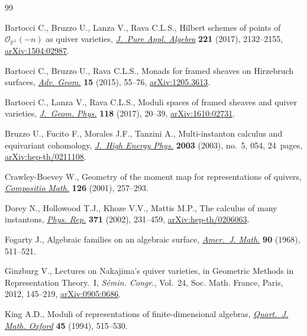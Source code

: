 \documentclass[pdftex]{sigma}
\numberwithin{equation}{section}
\begin{document}
\begin{thebibliography}{99}
\footnotesize\itemsep=0pt

Bartocci C., Bruzzo U., Lanza V., Rava C.L.S., Hilbert schemes of points of
 {${\mathcal O}_{{\mathbb P}^1}(-n)$} as quiver varieties, \href{https://doi.org/10.1016/j.jpaa.2016.12.012}{\textit{J.~Pure
 Appl. Algebra}} \textbf{221} (2017), 2132--2155, \href{https://arxiv.org/abs/1504:02987}{arXiv:1504:02987}.

Bartocci C., Bruzzo U., Rava C.L.S., Monads for framed sheaves on {H}irzebruch
 surfaces, \href{https://doi.org/10.1515/advgeom-2014-0027}{\textit{Adv. Geom.}} \textbf{15} (2015), 55--76, \href{https://arxiv.org/abs/1205.3613}{arXiv:1205.3613}.

Bartocci C., Lanza V., Rava C.L.S., Moduli spaces of framed sheaves and quiver
 varieties, \href{https://doi.org/10.1016/j.geomphys.2016.10.011}{\textit{J.~Geom. Phys.}} \textbf{118} (2017), 20--39,
 \href{https://arxiv.org/abs/1610:02731}{arXiv:1610:02731}.

Bruzzo U., Fucito F., Morales J.F., Tanzini A., Multi-instanton calculus and
 equivariant cohomology, \href{https://doi.org/10.1088/1126-6708/2003/05/054}{\textit{J.~High Energy Phys.}} \textbf{2003} (2003),
 no.~5, 054, 24~pages, \href{https://arxiv.org/abs/hep-th/0211108}{arXiv:hep-th/0211108}.

Crawley-Boevey W., Geometry of the moment map for representations of quivers,
 \href{https://doi.org/10.1023/A:1017558904030}{\textit{Compositio Math.}} \textbf{126} (2001), 257--293.

Dorey N., Hollowood T.J., Khoze V.V., Mattis M.P., The calculus of many
 instantons, \href{https://doi.org/10.1016/S0370-1573(02)00301-0}{\textit{Phys. Rep.}} \textbf{371} (2002), 231--459,
 \href{https://arxiv.org/abs/hep-th/0206063}{arXiv:hep-th/0206063}.

Fogarty J., Algebraic families on an algebraic surface, \href{https://doi.org/10.2307/2373541}{\textit{Amer.~J. Math.}}
 \textbf{90} (1968), 511--521.

Ginzburg V., Lectures on {N}akajima's quiver varieties, in Geometric Methods in
 Representation Theory.~{I}, \textit{S\'{e}min. Congr.}, Vol.~24, Soc. Math.
 France, Paris, 2012, 145--219, \href{https://arxiv.org/abs/0905:0686}{arXiv:0905:0686}.

King A.D., Moduli of representations of finite-dimensional algebras,
 \href{https://doi.org/10.1093/qmath/45.4.515}{\textit{Quart.~J. Math. Oxford}} \textbf{45} (1994), 515--530.


\end{thebibliography}
\end{document}
